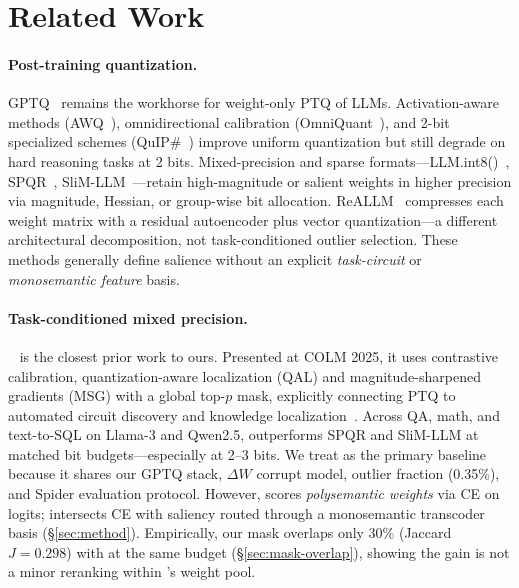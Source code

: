 \section{Related Work}
\label{sec:related}

\paragraph{Post-training quantization.}
GPTQ~\citep{frantar2023gptq} remains the workhorse for weight-only PTQ of LLMs.
Activation-aware methods (AWQ~\citep{lin2024awq}), omnidirectional calibration
(OmniQuant~\citep{shao2024omniquant}), and 2-bit specialized schemes
(QuIP\#~\citep{chee2024quip}) improve uniform quantization but still degrade on hard reasoning
tasks at 2 bits.
Mixed-precision and sparse formats---LLM.int8()~\citep{dettmers2022llmint8},
SPQR~\citep{dettmers2023spqr}, SliM-LLM~\citep{huang2025slimllm}---retain high-magnitude or
salient weights in higher precision via magnitude, Hessian, or group-wise bit allocation.
ReALLM~\citep{bedin2025reallm} compresses each weight matrix with a residual autoencoder plus
vector quantization---a different architectural decomposition, not task-conditioned outlier
selection.
These methods generally define salience without an explicit \emph{task-circuit} or
\emph{monosemantic feature} basis.

\paragraph{Task-conditioned mixed precision.}
\baseline{}~\citep{xiao2025tacq} is the closest prior work to ours.
Presented at COLM 2025, it uses contrastive calibration, quantization-aware localization (QAL)
and magnitude-sharpened gradients (MSG) with a global top-$p$ mask, explicitly connecting PTQ to
automated circuit discovery and knowledge localization~\citep{conmy2023automated}.
Across QA, math, and text-to-SQL on Llama-3 and Qwen2.5, \baseline{} outperforms SPQR and
SliM-LLM at matched bit budgets---especially at 2--3 bits.
We treat \baseline{} as the primary baseline because it shares our GPTQ stack, $\Delta W$ corrupt
model, outlier fraction (0.35\%), and Spider evaluation protocol.
However, \baseline{} scores \emph{polysemantic weights} via CE on logits; \method{} intersects CE
with saliency routed through a monosemantic transcoder basis (\S\ref{sec:method}).
Empirically, our \method{} mask overlaps only 30\% (Jaccard $J{=}0.298$) with \baseline{} at the same
budget (\S\ref{sec:mask-overlap}), showing the gain is not a minor reranking within \baseline{}'s
weight pool.

